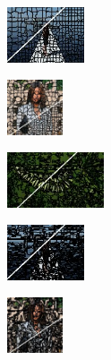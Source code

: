 \begin{figure}
	\begin{subfigure}[b]{0.129\textwidth}
		\includegraphics[height=1.65cm]{pictures/sbd/pb/cropped/pb_0004774_contours}
	\end{subfigure}
	\begin{subfigure}[b]{0.10\textwidth}
		\includegraphics[height=1.65cm]{pictures/fash/pb/cropped/pb_010_contours}
	\end{subfigure}
	\begin{subfigure}[b]{0.02\textwidth}
	\end{subfigure}
	\begin{subfigure}[b]{0.16\textwidth}
		\includegraphics[height=1.65cm]{pictures/bsds500/seeds/cropped/seeds_35028_contours}
	\end{subfigure}
	\begin{subfigure}[b]{0.129\textwidth}
		\includegraphics[height=1.65cm]{pictures/sbd/seeds/cropped/seeds_0004774_contours}
	\end{subfigure}
	\begin{subfigure}[b]{0.10\textwidth}
		\includegraphics[height=1.65cm]{pictures/fash/seeds/cropped/seeds_010_contours}
	\end{subfigure}\\
	\begin{subfigure}[b]{0.02\textwidth}

\end{subfigure}
\end{figure}
